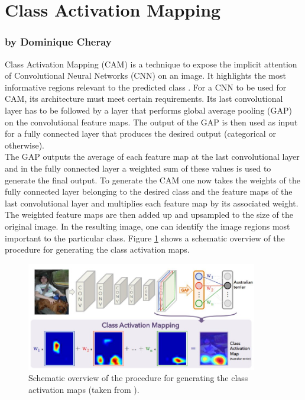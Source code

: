 \documentclass[11pt]{report}
\begin{document}
\section {Class Activation Mapping}
\label{CAM}
\subsubsection{by Dominique Cheray}
Class Activation Mapping (CAM) is a technique to expose the implicit attention
of Convolutional Neural Networks (CNN) on an image. It highlights the most
informative regions relevant to the predicted class \cite{zhou2016learning}. For a
CNN to be used for CAM, its architecture must meet certain requirements. Its
last convolutional layer has to be followed by a layer that performs global
average pooling (GAP) on the convolutional feature maps. The output of the GAP
is then used as input for a fully connected layer that produces the desired
output (categorical or otherwise). \\
The GAP outputs the average of each feature map at the last convolutional layer
and in the fully connected layer a weighted sum of these values is used to
generate the final output. To generate the CAM one now takes the weights of the
fully connected layer belonging to the desired class and the feature maps of the
last convolutional layer and multiplies each feature map by its associated
weight. The weighted feature maps are then added up and upsampled to the size of
the original image. In the resulting image, one can identify the image regions
most important to the particular class. Figure \ref{SchematicCAM} shows a
schematic overview of the procedure for generating the class activation maps.
\begin{figure}
  \centering
  \includegraphics[width=0.9\textwidth]{CAM_graphik}
  \caption{Schematic overview of the procedure for generating the class activation maps (taken from
    \cite{zhou2016learning}).}
  \label{SchematicCAM}
\end{figure}
\end{document}
